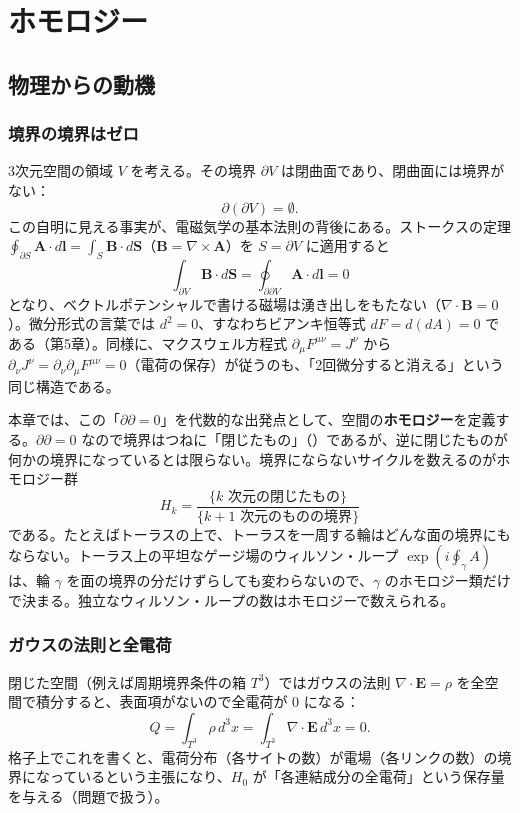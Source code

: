\chapter{ホモロジー}\label{ch:04}

\section{物理からの動機}

\subsection*{境界の境界はゼロ}
3次元空間の領域 $V$ を考える。その境界 $\partial V$ は閉曲面であり、閉曲面には境界がない：
\[
\partial(\partial V)=\emptyset .
\]
この自明に見える事実が、電磁気学の基本法則の背後にある。ストークスの定理 $\oint_{\partial S}\bm A\cdot d\bm l=\int_S\bm B\cdot d\bm S$（$\bm B=\nabla\times\bm A$）を $S=\partial V$ に適用すると
\[
\int_{\partial V}\bm B\cdot d\bm S=\oint_{\partial\partial V}\bm A\cdot d\bm l=0
\]
となり、ベクトルポテンシャルで書ける磁場は湧き出しをもたない（$\nabla\cdot\bm B=0$）。微分形式の言葉では $d^2=0$、すなわちビアンキ恒等式 $dF=d(dA)=0$ である（第5章）。同様に、マクスウェル方程式 $\partial_\mu F^{\mu\nu}=J^\nu$ から $\partial_\nu J^\nu=\partial_\nu\partial_\mu F^{\mu\nu}=0$（電荷の保存）が従うのも、「2回微分すると消える」という同じ構造である。

本章では、この「$\partial\partial=0$」を代数的な出発点として、空間の\textbf{ホモロジー}を定義する。$\partial\partial=0$ なので境界はつねに「閉じたもの」（）であるが、逆に閉じたものが何かの境界になっているとは限らない。境界にならないサイクルを数えるのがホモロジー群
\[
H_k=\frac{\{\text{$k$ 次元の閉じたもの}\}}{\{\text{$k+1$ 次元のものの境界}\}}
\]
である。たとえばトーラスの上で、トーラスを一周する輪はどんな面の境界にもならない。トーラス上の平坦なゲージ場のウィルソン・ループ $\exp(i\oint_\gamma A)$ は、輪 $\gamma$ を面の境界の分だけずらしても変わらないので、$\gamma$ のホモロジー類だけで決まる。独立なウィルソン・ループの数はホモロジーで数えられる。

\subsection*{ガウスの法則と全電荷}
閉じた空間（例えば周期境界条件の箱 $T^3$）ではガウスの法則 $\nabla\cdot\bm E=\rho$ を全空間で積分すると、表面項がないので全電荷が $0$ になる：
\[
Q=\int_{T^3}\rho\,d^3x=\int_{T^3}\nabla\cdot\bm E\,d^3x=0 .
\]
格子上でこれを書くと、電荷分布（各サイトの数）が電場（各リンクの数）の境界になっているという主張になり、$H_0$ が「各連結成分の全電荷」という保存量を与える（問題で扱う）。

